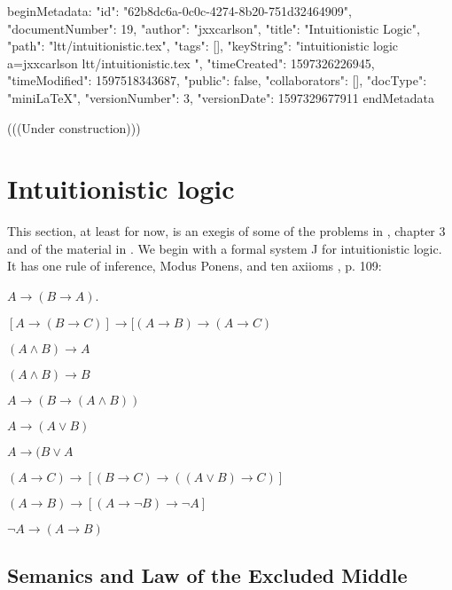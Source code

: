 beginMetadata:
{
    "id": "62b8dc6a-0c0c-4274-8b20-751d32464909",
    "documentNumber": 19,
    "author": "jxxcarlson",
    "title": "Intuitionistic Logic",
    "path": "ltt/intuitionistic.tex",
    "tags": [],
    "keyString": "intuitionistic logic a=jxxcarlson ltt/intuitionistic.tex ",
    "timeCreated": 1597326226945,
    "timeModified": 1597518343687,
    "public": false,
    "collaborators": [],
    "docType": "miniLaTeX",
    "versionNumber": 3,
    "versionDate": 1597329677911
}
endMetadata


\begin{mathmacro}
\newcommand{\set}[1]{\{ #1 \}}
\newcommand{\opensets}[0]{\mathcal{O}}
\newcommand{\for}[0]{\mathcal{F}}
\newcommand{\axioms}[0]{\mathcal{A}}
\newcommand{\theorems}[0]{\mathcal{T}}
\end{mathmacro}

(((Under construction)))


\section{Intuitionistic logic}

\innertableofcontents

This section, at least for now, is an exegis of some of the problems in \cite{RH}, chapter 3 and of the material in \cite{WKIL}.  We begin with a formal system J for intuitionistic logic. It has one rule of inference, Modus Ponens, and ten axiioms \cite{RH}, p. 109:

 $A \to (B \to A)$.

 $[A \to (B \to C)] \to [(A \to B) \to (A \to C) $

 $(A \land B) \to A$

 $(A \land B) \to B$

 $A \to (B \to (A \land B)) $

 $A \to (A \lor B)$

 $A \to (B \lor A$

 $(A \to C) \to [(B \to C) \to ((A \lor B) \to C)] $

 $(A \to B) \to [(A \to \neg B) \to \neg A ] $

 $\neg A \to (A \to B) $

\subsection{Semanics and Law of the Excluded Middle}

